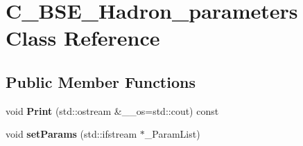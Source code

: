 \hypertarget{class_c___b_s_e___hadron__parameters}{\section{C\-\_\-\-B\-S\-E\-\_\-\-Hadron\-\_\-parameters Class Reference}
\label{class_c___b_s_e___hadron__parameters}
}
\subsection*{Public Member Functions}
\begin{DoxyCompactItemize}
\item 
\hypertarget{class_c___b_s_e___hadron__parameters_a8fbe8f04ce6ebc396e2a424ec14ed8be}{void {\bfseries Print} (std\-::ostream \&\-\_\-\-\_\-os=std\-::cout) const }\label{class_c___b_s_e___hadron__parameters_a8fbe8f04ce6ebc396e2a424ec14ed8be}

\item 
\hypertarget{class_c___b_s_e___hadron__parameters_ac1739ea129ef87c7db78f613ad6b84e2}{void {\bfseries set\-Params} (std\-::ifstream $\ast$\-\_\-\-Param\-List)}\label{class_c___b_s_e___hadron__parameters_ac1739ea129ef87c7db78f613ad6b84e2}

\end{DoxyCompactItemize}
